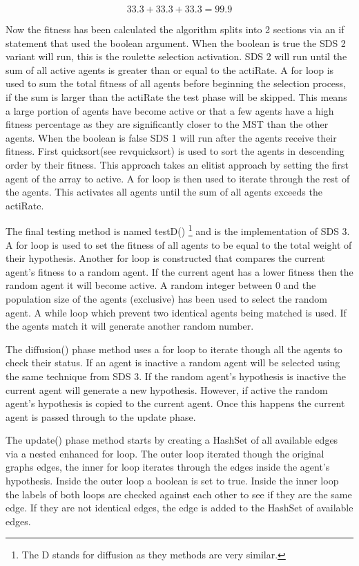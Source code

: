 \documentclass{AISB2008}
\begin{document}
{\begin{equation}
33.3 + 33.3 + 33.3 = 99.9
\end{equation}

Now the fitness has been calculated the algorithm splits into 2 sections via an if statement that used the boolean argument. When the boolean is true the SDS 2 variant will run, this is the roulette selection activation. SDS 2 will run until the sum of all active agents is greater than or equal to the actiRate. A for loop is used to sum the total fitness of all agents before beginning the selection process, if the sum is larger than the actiRate the test phase will be skipped. This means a large portion of agents have become active or that a few agents have a high fitness percentage as they are significantly closer to the MST than the other agents.
When the boolean is false SDS 1 will run after the agents receive their fitness. First quicksort(see rev{quicksort}) is used to sort the agents in descending order by their fitness. This approach takes an elitist approach by setting the first agent of the array to active. A for loop is then used to iterate through the rest of the agents. This activates all agents until the sum of all agents exceeds the actiRate.

The final testing method is named testD() \footnote{The D stands for diffusion as they methods are very similar.} and is the implementation of SDS 3. A for loop is used to set the fitness of all agents to be equal to the total weight of their hypothesis. Another for loop is constructed that compares the current agent’s fitness to a random agent. If the current agent has a lower fitness then the random agent it will become active. A random integer between 0 and the population size of the agents (exclusive) has been used to select the random agent. A while loop which prevent two identical agents being matched is used. If the agents match it will generate another random number.

The diffusion() phase method uses a for loop to iterate though all the agents to check their status. If an agent is inactive a random agent will be selected using the same technique from SDS 3. If the random agent’s hypothesis is inactive the current agent will generate a new hypothesis. However, if active the random agent’s hypothesis is copied to the current agent. Once this happens the current agent is passed through to the update phase.

The update() phase method starts by creating a HashSet of all available edges via a nested enhanced for loop. The outer loop iterated though the original graphs edges, the inner for loop iterates through the edges inside the agent’s hypothesis. Inside the outer loop a boolean is set to true. Inside the inner loop the labels of both loops are checked against each other to see if they are the same edge. If they are not identical edges, the edge is added to the HashSet of available edges.

}
\end{document}
